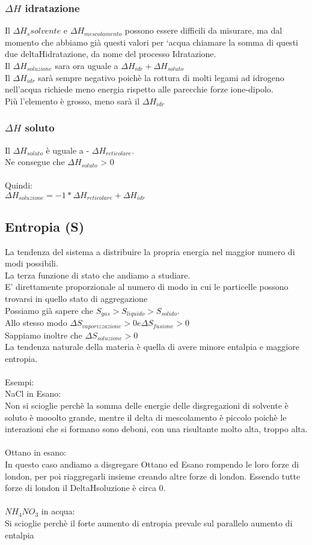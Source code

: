 \subsubsection{$\Delta H$ idratazione}
Il $\Delta H_s{solvente}$ e $\Delta H_{mescolamento}$ possono essere difficili da misurare, ma dal momento che abbiamo già questi valori per ‘acqua chiamare la somma di questi due deltaHidratazione, da nome del processo Idratazione.\\
Il $\Delta H_{soluzione}$ sara ora uguale a $\Delta H_{idr} + \Delta H_{soluto}$\\
Il $\Delta H_{idr}$ sarà sempre negativo poichè la rottura di molti legami ad idrogeno nell’acqua richiede meno energia rispetto alle parecchie forze ione-dipolo.\\
Più l’elemento è grosso, meno sarà il $\Delta H_{idr}$
\subsubsection{$\Delta H$ soluto}
Il $\Delta H_{soluto}$ è uguale a - $\Delta H_{reticolare}$. \\
Ne consegue che $\Delta H_{soluto}$ > 0\\\\
Quindi:\\
$\Delta H_{soluzione} = -1 * \Delta H_{reticolare} + \Delta H_{idr}$
\subsection{Entropia (S)}
La tendenza del sistema a distribuire la propria energia nel maggior numero di modi possibili. \\
La terza funzione di stato che andiamo a studiare. \\
E' direttamente proporzionale al numero di modo in cui le particelle possono trovarsi in quello stato di aggregazione \\
Possiamo già sapere che $S_{gas} > S_{liquido} > S_{solido}$. \\
Allo stesso modo $\Delta S_{vaporizzazione} > 0 e \Delta S_{fusione} > 0$\\
Sappiamo inoltre che $\Delta S_{soluzione} > 0$\\
La tendenza naturale della materia è quella di avere minore entalpia e maggiore entropia. \\\\
Esempi:\\
NaCl in Esano:\\
Non si scioglie perchè la somma delle energie delle disgregazioni di solvente è soluto è mooolto grande, mentre il delta di mescolamento è piccolo poichè le interazioni che si formano sono deboni, con una risultante molto alta, troppo alta.\\\\
Ottano in esano:\\
In questo caso andiamo a  disgregare Ottano ed Esano rompendo le loro forze di london, per poi riaggregarli insieme creando altre forze di london. Essendo tutte forze di london il DeltaHsoluzione è circa 0.\\\\
$NH_4NO_3$ in acqua:\\
Si scioglie perchè il forte aumento di entropia prevale sul parallelo aumento di entalpia 
